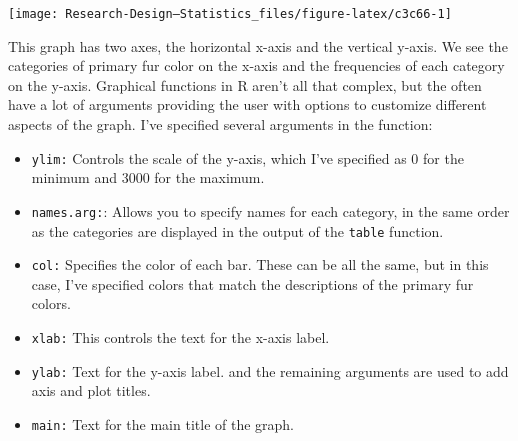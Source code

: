 \documentclass[
]{book}
\newenvironment{Shaded}{\begin{snugshade}}{\end{snugshade}}
\newcommand{\AttributeTok}[1]{\textcolor[rgb]{0.13,0.29,0.53}{#1}}
\newcommand{\DecValTok}[1]{\textcolor[rgb]{0.00,0.00,0.81}{#1}}
\newcommand{\FunctionTok}[1]{\textcolor[rgb]{0.13,0.29,0.53}{\textbf{#1}}}
\newcommand{\NormalTok}[1]{#1}
\newcommand{\SpecialCharTok}[1]{\textcolor[rgb]{0.81,0.36,0.00}{\textbf{#1}}}
\newcommand{\StringTok}[1]{\textcolor[rgb]{0.31,0.60,0.02}{#1}}
\providecommand{\tightlist}{%
  \setlength{\itemsep}{0pt}\setlength{\parskip}{0pt}}
\begin{document}
\begin{Shaded}
\end{Shaded}

\begin{center}\texttt{[image: Research-Design---Statistics\_files/figure-latex/c3c66-1]} \end{center}

This graph has two axes, the horizontal x-axis and the vertical y-axis. We see the categories of primary fur color on the x-axis and the frequencies of each category on the y-axis. Graphical functions in R aren't all that complex, but the often have a lot of arguments providing the user with options to customize different aspects of the graph. I've specified several arguments in the function:

\begin{itemize}
\tightlist
\item
  \texttt{ylim:} Controls the scale of the y-axis, which I've specified as 0 for the minimum and 3000 for the maximum.\\
\item
  \texttt{names.arg:}: Allows you to specify names for each category, in the same order as the categories are displayed in the output of the \texttt{table} function.
\item
  \texttt{col:} Specifies the color of each bar. These can be all the same, but in this case, I've specified colors that match the descriptions of the primary fur colors.
\item
  \texttt{xlab:} This controls the text for the x-axis label.
\item
  \texttt{ylab:} Text for the y-axis label. and the remaining arguments are used to add axis and plot titles.
\item
  \texttt{main:} Text for the main title of the graph.
\end{itemize}
\end{document}
